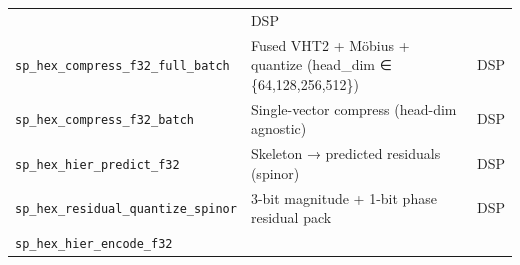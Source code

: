 \documentclass[
  11pt,
]{article}
\begin{document}
\begin{longtable}[]{@{}lll@{}}
\begin{minipage}[t]{0.32\columnwidth}
\end{minipage} & \begin{minipage}[t]{0.21\columnwidth}\raggedright
DSP\strut
\end{minipage}\tabularnewline
\begin{minipage}[t]{0.39\columnwidth}\raggedright
\texttt{sp\_hex\_compress\_f32\_full\_batch}\strut
\end{minipage} & \begin{minipage}[t]{0.32\columnwidth}\raggedright
Fused VHT2 + Möbius + quantize (head\_dim ∈ \{64,128,256,512\})\strut
\end{minipage} & \begin{minipage}[t]{0.21\columnwidth}\raggedright
DSP\strut
\end{minipage}\tabularnewline
\begin{minipage}[t]{0.39\columnwidth}\raggedright
\texttt{sp\_hex\_compress\_f32\_batch}\strut
\end{minipage} & \begin{minipage}[t]{0.32\columnwidth}\raggedright
Single-vector compress (head-dim agnostic)\strut
\end{minipage} & \begin{minipage}[t]{0.21\columnwidth}\raggedright
DSP\strut
\end{minipage}\tabularnewline
\begin{minipage}[t]{0.39\columnwidth}\raggedright
\texttt{sp\_hex\_hier\_predict\_f32}\strut
\end{minipage} & \begin{minipage}[t]{0.32\columnwidth}\raggedright
Skeleton → predicted residuals (spinor)\strut
\end{minipage} & \begin{minipage}[t]{0.21\columnwidth}\raggedright
DSP\strut
\end{minipage}\tabularnewline
\begin{minipage}[t]{0.39\columnwidth}\raggedright
\texttt{sp\_hex\_residual\_quantize\_spinor}\strut
\end{minipage} & \begin{minipage}[t]{0.32\columnwidth}\raggedright
3-bit magnitude + 1-bit phase residual pack\strut
\end{minipage} & \begin{minipage}[t]{0.21\columnwidth}\raggedright
DSP\strut
\end{minipage}\tabularnewline
\begin{minipage}[t]{0.39\columnwidth}\raggedright
\texttt{sp\_hex\_hier\_encode\_f32}\strut

\end{minipage}
\end{longtable}
\end{document}
